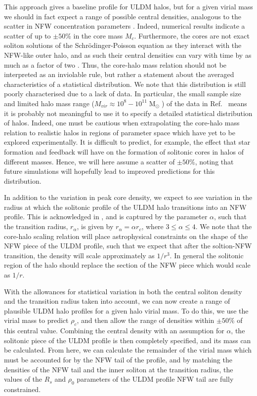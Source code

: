\documentclass[a4paper,11pt]{article}
\begin{document}
This approach gives a baseline profile for ULDM halos, but for a given virial mass we should in fact expect a range of possible central densities, analogous to the scatter in NFW concentration parameters \cite{Maccio:2008pcd}. Indeed, numerical results \cite{Schive:2014hza} indicate a scatter of up to $\pm 50\%$ in the core mass $M_c$. Furthermore, the cores are not exact soliton solutions of the Schr\"{o}dinger-Poisson equation as they interact with the NFW-like outer halo, and as such their central densities can vary with time by as much as a factor of two \cite{Veltmaat:2018dfz}. Thus, the core-halo mass relation should not be interpreted as an inviolable rule, but rather a statement about the averaged characteristics of a statistical distribution. We note that this distribution is still poorly characterised due to a lack of data. In particular, the small sample size and limited halo mass range ($ M_{vir} \approx 10^8-10^{11} \operatorname{M}_{\odot}$)  of the data in Ref.~\cite{Schive:2014hza} means it is probably not meaningful to use it to specify a detailed statistical distribution of halos. Indeed, one must be cautious when extrapolating the core-halo mass relation to realistic halos in regions of parameter space which have yet to be explored experimentally. It is difficult to predict, for example, the effect that star formation and feedback will have on the formation of solitonic cores in halos of different masses. Hence, we will here assume a scatter of $\pm 50\%$, noting that future simulations will hopefully lead to improved predictions for this distribution. 

In addition to the variation in peak core density, we expect to see variation in the radius at which the solitonic profile of the ULDM halo transitions into an NFW profile. This is acknowledged in \cite{Robles:2018fur}, and is captured by the parameter $\alpha$, such that the transition radius, $r_{\alpha}$, is given by $r_{\alpha} = \alpha r_c$, where $3 \leq \alpha \leq 4$. We note that the core-halo scaling relation will place astrophysical constraints on the shape of the NFW piece of the ULDM profile, such that we expect that after the soltion-NFW transition, the density will scale approximately as $1/r^3$. In general the solitonic region of the halo should replace the section of the NFW piece which would scale as $1/r$.  


With the allowances for statistical variation in both the central soliton density and the transition radius taken into account, we can now create a range of plausible ULDM halo profiles for a given halo virial mass. To do this, we use the virial mass to predict $\rho_c$, and then allow the range of densities within $\pm 50\% $ of this central value. Combining the central density with an assumption for $\alpha$, the solitonic piece of the ULDM profile is then completely specified, and its mass can be calculated. From here, we can calculate the remainder of the virial mass which must be accounted for by the NFW tail of the profile, and by matching the densities of the NFW tail and the inner soliton at the transition radius, the values of the $R_s$ and $\rho_0$ parameters of the ULDM profile NFW tail are fully constrained.  
\end{document}
